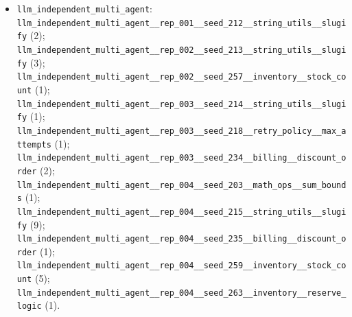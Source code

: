 \documentclass[12pt,a4paper,oneside]{report}
\begin{document}
\begin{itemize}
\item \texttt{llm\allowbreak\_independent\allowbreak\_multi\allowbreak\_agent}: \texttt{llm\allowbreak\_independent\allowbreak\_multi\allowbreak\_agent\allowbreak\_\allowbreak\_rep\allowbreak\_001\allowbreak\_\allowbreak\_seed\allowbreak\_212\allowbreak\_\allowbreak\_string\allowbreak\_utils\allowbreak\_\allowbreak\_slugify} (2); \texttt{llm\allowbreak\_independent\allowbreak\_multi\allowbreak\_agent\allowbreak\_\allowbreak\_rep\allowbreak\_002\allowbreak\_\allowbreak\_seed\allowbreak\_213\allowbreak\_\allowbreak\_string\allowbreak\_utils\allowbreak\_\allowbreak\_slugify} (3); \texttt{llm\allowbreak\_independent\allowbreak\_multi\allowbreak\_agent\allowbreak\_\allowbreak\_rep\allowbreak\_002\allowbreak\_\allowbreak\_seed\allowbreak\_257\allowbreak\_\allowbreak\_inventory\allowbreak\_\allowbreak\_stock\allowbreak\_count} (1); \texttt{llm\allowbreak\_independent\allowbreak\_multi\allowbreak\_agent\allowbreak\_\allowbreak\_rep\allowbreak\_003\allowbreak\_\allowbreak\_seed\allowbreak\_214\allowbreak\_\allowbreak\_string\allowbreak\_utils\allowbreak\_\allowbreak\_slugify} (1); \texttt{llm\allowbreak\_independent\allowbreak\_multi\allowbreak\_agent\allowbreak\_\allowbreak\_rep\allowbreak\_003\allowbreak\_\allowbreak\_seed\allowbreak\_218\allowbreak\_\allowbreak\_retry\allowbreak\_policy\allowbreak\_\allowbreak\_max\allowbreak\_attempts} (1); \texttt{llm\allowbreak\_independent\allowbreak\_multi\allowbreak\_agent\allowbreak\_\allowbreak\_rep\allowbreak\_003\allowbreak\_\allowbreak\_seed\allowbreak\_234\allowbreak\_\allowbreak\_billing\allowbreak\_\allowbreak\_discount\allowbreak\_order} (2); \texttt{llm\allowbreak\_independent\allowbreak\_multi\allowbreak\_agent\allowbreak\_\allowbreak\_rep\allowbreak\_004\allowbreak\_\allowbreak\_seed\allowbreak\_203\allowbreak\_\allowbreak\_math\allowbreak\_ops\allowbreak\_\allowbreak\_sum\allowbreak\_bounds} (1); \texttt{llm\allowbreak\_independent\allowbreak\_multi\allowbreak\_agent\allowbreak\_\allowbreak\_rep\allowbreak\_004\allowbreak\_\allowbreak\_seed\allowbreak\_215\allowbreak\_\allowbreak\_string\allowbreak\_utils\allowbreak\_\allowbreak\_slugify} (9); \texttt{llm\allowbreak\_independent\allowbreak\_multi\allowbreak\_agent\allowbreak\_\allowbreak\_rep\allowbreak\_004\allowbreak\_\allowbreak\_seed\allowbreak\_235\allowbreak\_\allowbreak\_billing\allowbreak\_\allowbreak\_discount\allowbreak\_order} (1); \texttt{llm\allowbreak\_independent\allowbreak\_multi\allowbreak\_agent\allowbreak\_\allowbreak\_rep\allowbreak\_004\allowbreak\_\allowbreak\_seed\allowbreak\_259\allowbreak\_\allowbreak\_inventory\allowbreak\_\allowbreak\_stock\allowbreak\_count} (5); \texttt{llm\allowbreak\_independent\allowbreak\_multi\allowbreak\_agent\allowbreak\_\allowbreak\_rep\allowbreak\_004\allowbreak\_\allowbreak\_seed\allowbreak\_263\allowbreak\_\allowbreak\_inventory\allowbreak\_\allowbreak\_reserve\allowbreak\_logic} (1).

\end{itemize}
\end{document}
